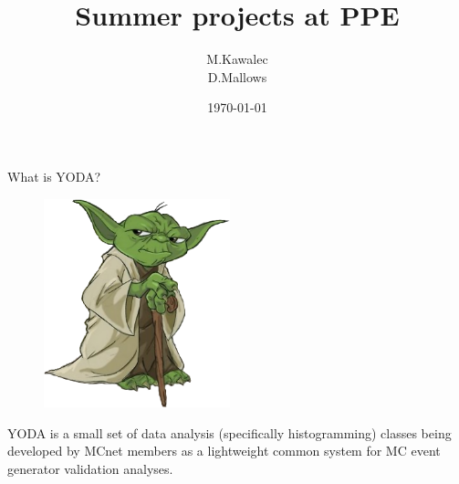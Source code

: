 \documentclass{beamer}
\title{Summer projects at PPE}
\author{M.Kawalec \\ D.Mallows}
\date{\today}
\begin{document}
  

  
  \begin{frame}{What is YODA?}
  \begin{figure}
  \begin{center}
    \includegraphics[width=0.48\textwidth]{yoda-logo}
  \end{center}
  \end{figure}
  YODA is a small set of data analysis (specifically histogramming) classes being developed by MCnet members as a lightweight common system for MC event generator validation analyses. 
  \end{frame}
\end{document}

